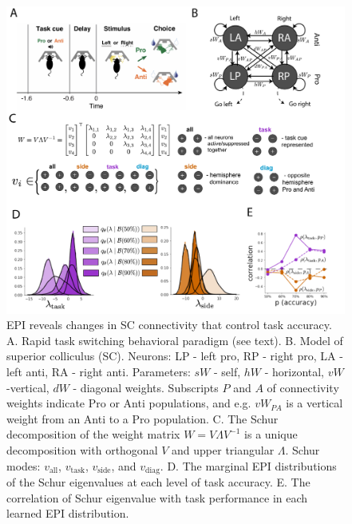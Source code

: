 \documentclass[11pt]{article}
\begin{document}
\begin{figure}
\begin{center}
\includegraphics[scale=0.5]{figures/fig4/fig4.pdf}
\end{center}
\caption{\small EPI reveals changes in SC \cite{duan2018collicular} connectivity that control task accuracy.  A. Rapid task switching behavioral paradigm (see text). B. Model of superior colliculus (SC). Neurons: LP - left pro, RP - right pro, LA - left anti, RA - right anti.  Parameters: $sW$ - self, $hW$ - horizontal, $vW$ -vertical, $dW$ - diagonal weights.  Subscripts $P$ and $A$ of connectivity weights indicate Pro or Anti populations, and e.g. $vW_{PA}$ is a vertical weight from an Anti to a Pro population.  C. The Schur decomposition of the weight matrix $W = V\Lambda V^{-1}$ is a unique decomposition with orthogonal $V$ and upper triangular $\Lambda$. Schur modes: $v_{\text{all}}$, $v_{\text{task}}$, $v_{\text{side}}$, and $v_{\text{diag}}$.  D. The marginal EPI distributions of the Schur eigenvalues at each level of task accuracy. E. The correlation of Schur eigenvalue with task performance in each learned EPI distribution.}
\label{fig:SC}
\end{figure}
\end{document}

